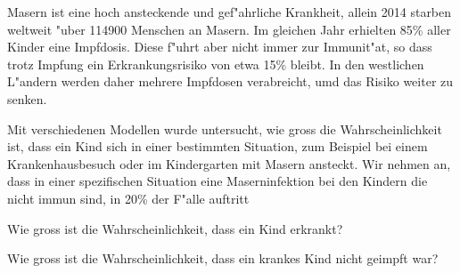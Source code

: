 Masern ist eine hoch ansteckende und gef"ahrliche Krankheit,
allein 2014 starben weltweit "uber 114900 Menschen an Masern.
Im gleichen Jahr erhielten 85\% aller Kinder eine Impfdosis.
Diese f"uhrt aber nicht immer zur Immunit"at, so dass trotz Impfung
ein Erkrankungsrisiko von etwa 15\% bleibt.
In den westlichen L"andern werden daher mehrere Impfdosen verabreicht,
umd das Risiko weiter zu senken.

Mit verschiedenen Modellen wurde untersucht, wie gross die Wahrscheinlichkeit
ist, dass ein Kind sich in einer bestimmten Situation, zum Beispiel
bei einem Krankenhausbesuch oder im Kindergarten mit Masern ansteckt.
Wir nehmen an, dass in einer spezifischen Situation eine Maserninfektion
bei den Kindern die nicht immun sind, in 20\% der F"alle auftritt

\begin{teilaufgaben}
\item
Wie gross ist die Wahrscheinlichkeit, dass ein Kind erkrankt?
\item
Wie gross ist die Wahrscheinlichkeit, dass ein krankes Kind nicht
geimpft war?
\end{teilaufgaben}

